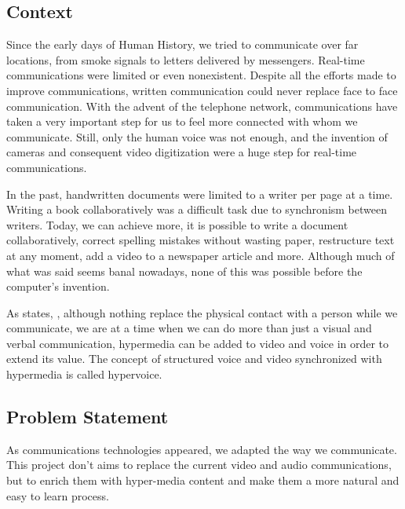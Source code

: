 \subsection{Context}   %
Since the early days of Human History, we tried to communicate over far locations, from smoke signals to letters delivered by messengers. Real-time communications were limited or even nonexistent. Despite all the efforts made to improve communications, written communication could never replace face to face communication.
With the advent of the telephone network, communications have taken a very important step for us to feel more connected with whom we communicate. Still, only the human voice was not enough, and the invention of cameras and consequent video digitization were a huge step for real-time communications.

	In the past, handwritten documents were limited to a writer per page at a time. Writing a book collaboratively was a difficult task due to synchronism between writers.
	Today, we can achieve more, it is possible to write a document collaboratively, correct spelling mistakes without wasting paper, restructure text at any moment, add a video to a newspaper article and more. Although much of what was said seems banal nowadays, none of this was possible before the computer's invention. 

	As \cite{geddes} states,  , although nothing replace the physical contact with a person while we communicate, we are at a time when we can do more than just a visual and verbal communication, hypermedia can be added to video and voice in order to extend its value. The concept of structured voice and video synchronized with hypermedia is called hypervoice.
        
\subsection{Problem Statement} %

	As communications technologies appeared, we adapted the way we communicate. This project don't aims to replace the current video and audio communications, but to enrich them with hyper-media content and make them a more natural and easy to learn process. 

